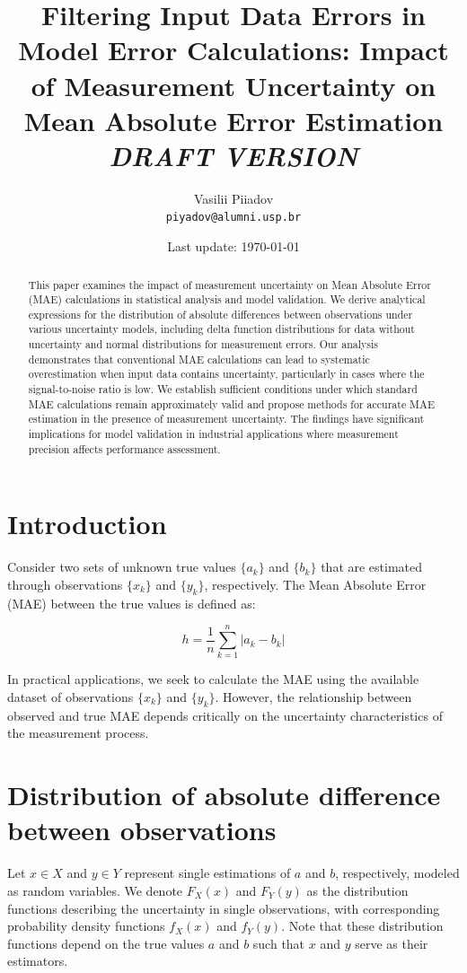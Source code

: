\documentclass[12pt,a4paper]{article}
\title{
	Filtering Input Data Errors in Model Error Calculations: Impact of Measurement Uncertainty on Mean Absolute Error Estimation\\
	\vspace{5mm}
	\textit{\large DRAFT VERSION}
}
\date{Last update: \today}
\author{
	\vspace{5mm}Vasilii Piiadov\\
	\texttt{piyadov@alumni.usp.br} \\
}
\theoremstyle{definition}
\begin{document}
\maketitle
\begin{abstract}
This paper examines the impact of measurement uncertainty on Mean Absolute Error (MAE) calculations in statistical analysis and model validation. We derive analytical expressions for the distribution of absolute differences between observations under various uncertainty models, including delta function distributions for data without uncertainty and normal distributions for measurement errors. Our analysis demonstrates that conventional MAE calculations can lead to systematic overestimation when input data contains uncertainty, particularly in cases where the signal-to-noise ratio is low. We establish sufficient conditions under which standard MAE calculations remain approximately valid and propose methods for accurate MAE estimation in the presence of measurement uncertainty. The findings have significant implications for model validation in industrial applications where measurement precision affects performance assessment.

\end{abstract}

\section{Introduction}

Consider two sets of unknown true values $\{a_k\}$ and $\{b_k\}$ that are estimated through observations $\{x_k\}$ and $\{y_k\}$, respectively. The Mean Absolute Error (MAE) between the true values is defined as:

\begin{equation}
	h = \frac{1}{n} \sum\limits_{k=1}^{n} \left\vert a_k - b_k \right\vert
	\label{eq:gen_mae}
\end{equation}

In practical applications, we seek to calculate the MAE using the available dataset of observations $\{x_k\}$ and $\{y_k\}$. However, the relationship between observed and true MAE depends critically on the uncertainty characteristics of the measurement process.


\section{Distribution of absolute difference between observations}

Let $x \in X$ and $y \in Y$ represent single estimations of $a$ and $b$, respectively, modeled as random variables. We denote $F_X(x)$ and $F_Y(y)$ as the distribution functions describing the uncertainty in single observations, with corresponding probability density functions $f_X(x)$ and $f_Y(y)$. Note that these distribution functions depend on the true values $a$ and $b$ such that $x$ and $y$ serve as their estimators.
\end{document}
